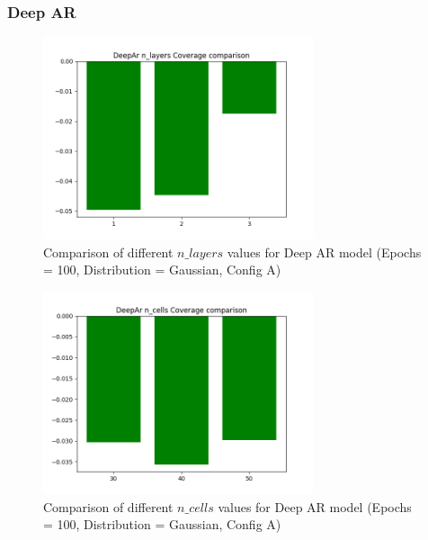 \subsubsection{Deep AR} \label{comp_deepar}

\begin{figure}[H]
    \centering
    \includegraphics[width=300px]{plots/hist/a/DeepAr/n_layers/Coverage.png}
    \caption{Comparison of different $n\_layers$ values for Deep AR model (Epochs = 100, Distribution = Gaussian, Config A)}
    \label{fig:comp_deepar_n_layers}
\end{figure}

\begin{figure}[H]
    \centering
    \includegraphics[width=300px]{plots/hist/a/DeepAr/n_cells/Coverage.png}
    \caption{Comparison of different $n\_cells$ values for Deep AR model (Epochs = 100, Distribution = Gaussian, Config A)}
    \label{fig:comp_deepar_n_cells}
\end{figure}

